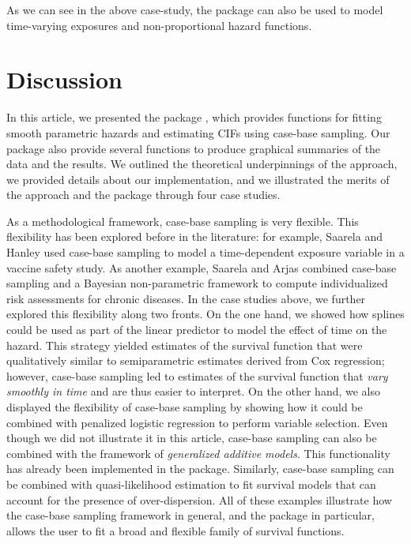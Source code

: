 \documentclass[
]{jss}
\begin{document}
As we can see in the above case-study, the  package can
also be used to model time-varying exposures and non-proportional hazard
functions.

\hypertarget{discussion}{%
\section{Discussion}\label{discussion}}

In this article, we presented the  package ,
which provides functions for fitting smooth parametric hazards and
estimating CIFs using case-base sampling. Our package also provide
several functions to produce graphical summaries of the data and the
results. We outlined the theoretical underpinnings of the approach, we
provided details about our implementation, and we illustrated the merits
of the approach and the package through four case studies.

As a methodological framework, case-base sampling is very flexible. This
flexibility has been explored before in the literature: for example,
Saarela and Hanley \citeyearpar{saarela2015case} used case-base sampling
to model a time-dependent exposure variable in a vaccine safety study.
As another example, Saarela and Arjas \citeyearpar{saarela2015non}
combined case-base sampling and a Bayesian non-parametric framework to
compute individualized risk assessments for chronic diseases. In the
case studies above, we further explored this flexibility along two
fronts. On the one hand, we showed how splines could be used as part of
the linear predictor to model the effect of time on the hazard. This
strategy yielded estimates of the survival function that were
qualitatively similar to semiparametric estimates derived from Cox
regression; however, case-base sampling led to estimates of the survival
function that \emph{vary smoothly in time} and are thus easier to
interpret. On the other hand, we also displayed the flexibility of
case-base sampling by showing how it could be combined with penalized
logistic regression to perform variable selection. Even though we did
not illustrate it in this article, case-base sampling can also be
combined with the framework of \emph{generalized additive models}. This
functionality has already been implemented in the package. Similarly,
case-base sampling can be combined with quasi-likelihood estimation to
fit survival models that can account for the presence of
over-dispersion. All of these examples illustrate how the case-base
sampling framework in general, and the package  in
particular, allows the user to fit a broad and flexible family of
survival functions.
\end{document}
